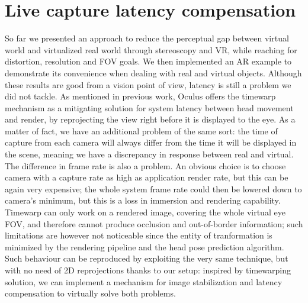 \section{Live capture latency compensation}
So far we presented an approach to reduce the perceptual gap between virtual world and virtualized real world through stereoscopy and VR, while reaching for distortion, resolution and FOV goals. We then implemented an AR example to demonstrate its convenience when dealing with real and virtual objects. Although these results are good from a vision point of view, latency is still a problem we did not tackle.
As mentioned in previous work, Oculus offers the timewarp mechanism as a mitigating solution for system latency between head movement and render, by reprojecting the view right before it is displayed to the eye. As a matter of fact, we have an additional problem of the same sort: the time of capture from each camera will always differ from the time it will be displayed in the scene, meaning we have a discrepancy in response between real and virtual.\\
The difference in frame rate is also a problem. An obvious choice is to choose camera with a capture rate as high as application render rate, but this can be again very expensive; the whole system frame rate could then be lowered down to camera’s minimum, but this is a loss in immersion and rendering capability.
Timewarp can only work on a rendered image, covering the whole virtual eye FOV, and therefore cannot produce occlusion and out-of-border information; such limitations are however not noticeable since the entity of tranformation is minimized by the rendering pipeline and the head pose prediction algorithm. Such behaviour can be reproduced by exploiting the very same technique, but with no need of 2D reprojections thanks to our setup: inspired by timewarping solution, we can implement a mechanism for image stabilization and latency compensation to virtually solve both problems.

